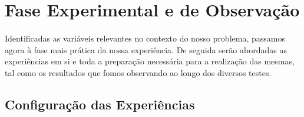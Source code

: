 \documentclass{article}
\begin{document}
\section{Fase Experimental e de Observação}
\paragraph{}
Identificadas as variáveis relevantes no contexto do nosso problema, passamos agora à fase mais prática da nossa experiência. De seguida serão abordadas as experiências em si e toda a preparação necessária para a realização das mesmas, tal como os resultados que fomos observando ao longo dos diversos testes.

\subsection{Configuração das Experiências}
\end{document}

